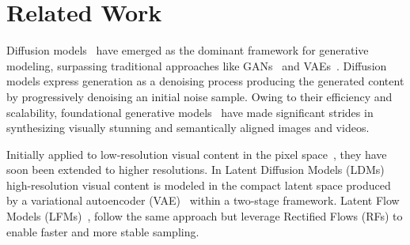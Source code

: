 \section{Related Work}
\label{sec:related-work}

Diffusion models~\cite{LSGM,LDM,song_score_based,DDPM,IDDPM,EDM} have emerged as the dominant framework for generative modeling, surpassing traditional approaches like GANs~\cite{GANs,StyleGAN} and VAEs~\cite{VAE}. Diffusion models express generation as a denoising process producing the generated content by progressively denoising an initial noise sample. Owing to their efficiency and scalability,
foundational generative models~\cite{Imagen,ImagenVideo,CogVideoX,SDXL,SVD,MovieGen} have made significant strides in synthesizing visually stunning and semantically aligned images and videos.

Initially applied to low-resolution visual content in the pixel space~\cite{LSGM,DDPM,IDDPM,EDM}, they have soon been extended to higher resolutions. In Latent Diffusion Models (LDMs)~\cite{LSGM,LDM} high-resolution visual content is modeled in the compact latent space produced by a variational autoencoder (VAE)~\cite{VAE} within a two-stage framework. Latent Flow Models (LFMs)~\cite{LFM,Instaflow}, follow the same approach but leverage Rectified Flows (RFs) to enable faster and more stable sampling.


